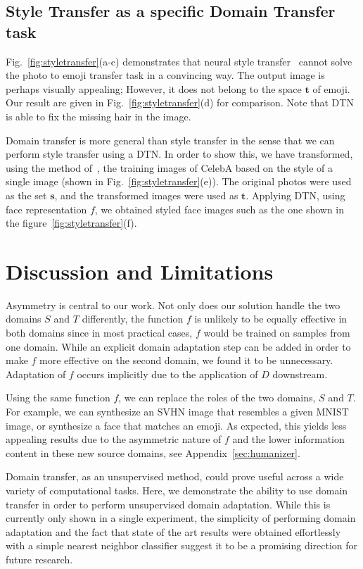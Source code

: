 \documentclass{article} %
\begin{document}
\subsection{Style Transfer as a specific Domain Transfer task}

Fig.~\ref{fig:styletransfer}(a-c) demonstrates that neural style transfer~\cite{styletransfer} cannot solve the photo to emoji transfer task in a convincing way. The output image is perhaps visually appealing; However, it does not belong to the space $\mathbf t$ of emoji. Our result are given in Fig.~\ref{fig:styletransfer}(d) for comparison. Note that DTN is able to fix the missing hair in the image.

Domain transfer is more general than style transfer in the sense that we can perform style transfer using a DTN. In order to show this, we have transformed, using the method of~\cite{Johnson2016Perceptual}, the training images of CelebA based on the style of a single image (shown in Fig.~\ref{fig:styletransfer}(e)). The original photos were used as the set $\mathbf s$, and the transformed images were used as $\mathbf t$. Applying DTN, using face representation $f$, we obtained styled face images such as the one shown in the figure~\ref{fig:styletransfer}(f).

\section{Discussion and Limitations}
\label{sec:conclusions}
Asymmetry is central to our work. Not only does our solution handle the two domains $S$ and $T$ differently, the function $f$ is unlikely to be equally effective in both domains since in most practical cases, $f$ would be trained on samples from one domain. While an explicit domain adaptation step can be added in order to make $f$ more effective on the second domain, we found it to be unnecessary. Adaptation of $f$ occurs implicitly due to the application of $D$ downstream. 

Using the same function $f$, we can replace the roles of the two domains, $S$ and $T$. For example, we can synthesize an SVHN image that resembles a given MNIST image, or synthesize a face that matches an emoji. As expected, this yields less appealing results due to the asymmetric nature of $f$ and the lower information content in these new source domains, see Appendix~\ref{sec:humanizer}.

Domain transfer, as an unsupervised method, could prove useful across a wide variety of computational tasks. Here, we demonstrate the ability to use domain transfer in order to perform unsupervised domain adaptation. While this is currently only shown in a single experiment, the simplicity of performing domain adaptation and the fact that state of the art results were obtained effortlessly with a simple nearest neighbor classifier suggest it to be a promising direction for future research.
\end{document}

